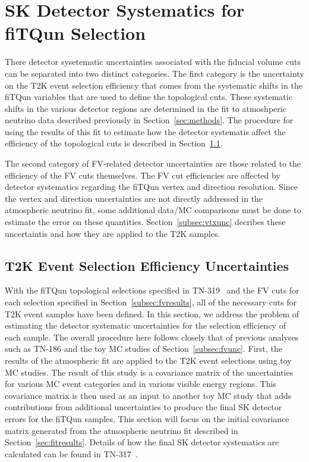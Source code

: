 

\section{SK Detector Systematics for fiTQun Selection}
\label{sec:skerr}

There detector sysetematic uncertainties associated with the fiducial volume
cuts can be separated into two distinct categories.  The first category is the
uncertainty on the T2K event selection efficiency that comes from the systematic
shifts in the fiTQun variables that are used to define the topological cuts.
These systematic shifts in the various detector regions are determined in the
fit to atmoshperic neutrino data described previously in Section~\ref{sec:methods}.
The procedure for using the results of this fit to estimate how the detector
systematis affect the efficiency of the topological cuts is described in Section~\ref{subsec:skselect}.

The second category of FV-related detector uncertainties are those related to the efficiency
of the FV cuts themselves.  The FV cut efficiencies are affected by detector systematics regarding
the fiTQun vertex and direction resolution.  Since the vertex and direction uncertainties are not 
directly addressed in the atmospheric neutrino fit, some additional data/MC comparisons must be done
to estimate the error on these quantities.  Section~\ref{subsec:vtxunc} decribes these 
uncertaintis and how they are applied to the T2K samples.


\subsection{T2K Event Selection Efficiency Uncertainties}
\label{subsec:skselect}

With the fiTQun topological selections specified in TN-319~\cite{tn319} and the FV cuts
for each selection specified in Section~\ref{subsec:fvresults}, all of the necessary
cuts for T2K event samples have been defined.  In this section, we address the
problem of estimating the detector systematic uncertainties for the selection efficiency of each sample.
The overall procedure here follows closely that of previous analyses such
as TN-186 and the toy MC studies of Section~\ref{subsec:fvunc}.  First, the
results of the atmospheric fit are applied to the T2K
event selections using toy MC studies. The result of this study is a covariance
matrix of the uncertainties for various MC event categories and in various
visible energy regions.  This covariance matrix is then used as an input to
another toy MC study that adds contributions from additional uncertainties to
produce the final SK detector errors for the fiTQun samples.  This section will
focus on the initial covariance matrix generated from the atmospheric neutrino
fit described in Section~\ref{sec:fitresults}.  Details of how the final SK
detector systematics are calculated can be found in TN-317~\cite{tn317}.


